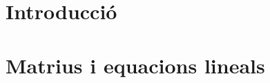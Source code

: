 \documentclass[11pt,fleqn]{book} %
\newcounter{let} \setcounter{let}{0}
\renewcommand{\1}{\mathbf{1}}
\newcommand{\0}{\mathbf{0}}
\begin{document}

\usechapterimagefalse %


\pagestyle{empty} %

\tableofcontents %

\cleardoublepage %

\pagestyle{fancy} %


\chapter{Introducció}
{
\let\subsection\subsubsection
\let\subsubsection\paragraph

}
\chapter{Matrius i equacions lineals}
{
\let\subsection\subsubsection
\let\subsubsection\paragraph

}
\end{document}
